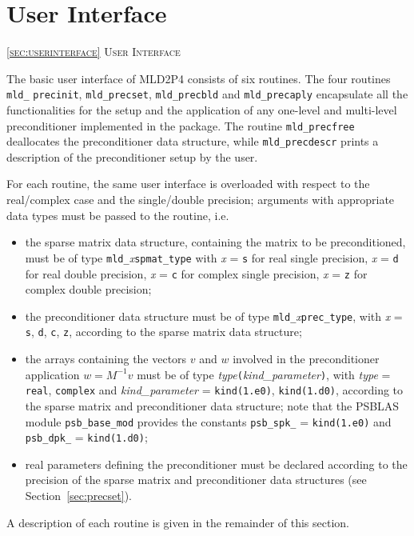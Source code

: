 \section{User Interface\label{sec:userinterface}}
         {\textsc{\ref{sec:userinterface} User Interface}}


The basic user interface of MLD2P4 consists of six routines. The four routines \verb|mld_| \verb|precinit|,
\verb|mld_precset|, \verb|mld_precbld| and \verb|mld_precaply| encapsulate all the functionalities
for the setup and the application of any one-level and multi-level
preconditioner implemented in the package.
The routine \verb|mld_precfree| deallocates the preconditioner data structure, while
\verb|mld_precdescr| prints a description of the preconditioner setup by the user.

For each routine, the same user interface is overloaded with
respect to the real/complex case and the single/double precision;
arguments with appropriate data types must be passed to the routine,
i.e.
\begin{itemize}
\item the sparse matrix data structure, containing the matrix to be
  preconditioned, must be of type \verb|mld_|\emph{x}\verb|spmat_type|
	with \emph{x} = \verb|s| for real single precision, \emph{x} = \verb|d|
	for real double precision, \emph{x} = \verb|c| for complex single precision,
	\emph{x} = \verb|z| for complex double precision;
\item the preconditioner data structure must be of type
  \verb|mld_|\emph{x}\verb|prec_type|, with \emph{x} =    
  \verb|s|, \verb|d|, \verb|c|, \verb|z|, according to the sparse
  matrix data structure;
\item the arrays containing the vectors $v$ and $w$ involved in
  the preconditioner application $w=M^{-1}v$ must be of type   
  \emph{type}\verb|(|\emph{kind\_parameter}\verb|)|, with \emph{type} =
  \verb|real|, \verb|complex| and \emph{kind\_parameter} = \verb|kind(1.e0)|,
  \verb|kind(1.d0)|, according to the sparse matrix and preconditioner
  data structure; note that the PSBLAS module \verb|psb_base_mod|
  provides the constants \verb|psb_spk_|
  = \verb|kind(1.e0)| and \verb|psb_dpk_| = \verb|kind(1.d0)|;
\item real parameters defining the preconditioner must be declared
  according to the precision of the sparse matrix and preconditioner
  data structures (see Section~\ref{sec:precset}).
\end{itemize}
A description of each routine is given in the remainder of this section.

